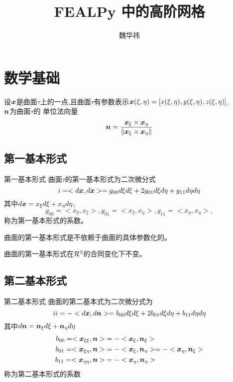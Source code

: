 \documentclass{article}
\begin{document}
\title{FEALPy 中的高阶网格}
\author{魏华祎}
\date{\chntoday}
\maketitle

\section{数学基础}
设${\boldsymbol x}$是曲面$\tau$上的一点,且曲面$\tau$有参数表示${\boldsymbol x}(\xi,\eta) 
= [x(\xi,\eta),y(\xi,\eta),z(\xi,\eta)]$,\\
${\boldsymbol n}$为曲面$\tau$的
单位法向量
$$
{\boldsymbol n} = \frac{{\boldsymbol x}_{\xi} \times {\boldsymbol x}_{\eta}}{\| {\boldsymbol x}_{\xi} \times {\boldsymbol x}_{\eta} \|}
$$
\subsection{第一基本形式}
\begin{definition}{第一基本形式}
	曲面$\tau$的第一基本形式为二次微分式
	$$
	\uppercase\expandafter{\romannumeral1} = 
	<d\bfx,d\bfx> = g_{00}d\xi d\xi + 2g_{01}d\xi d\eta + g_{11}d\eta d\eta 
	$$
	其中$d{\boldsymbol x} = x_{\xi}d\xi+x_{\eta}d\eta$,
	$$
	g_{00} = <x_{\xi},x_{\xi}>,
	g_{01} = <x_{\xi},x_{\eta}>,
	g_{11} = <x_{\eta},x_{\eta}>,
	$$
	称为第一基本形式的系数。
\end{definition}

\begin{property}
曲面的第一基本形式是不依赖于曲面的具体参数化的。
\end{property}

\begin{property}
曲面的第一基本形式在${\mathcal R}^3$的合同变化下不变。
\end{property}

\subsection{第二基本形式}
\begin{definition}{第二基本形式}
曲面的第二基本式为二次微分式为
$$
\uppercase\expandafter{\romannumeral2} = 
-<d\bfx,d\bfn> = b_{00}d\xi d\xi + 2b_{01}d\xi d\eta + b_{11}d\eta d\eta 
$$
其中$d{\boldsymbol n} = {\boldsymbol n}_{\xi} d\xi + {\boldsymbol n}_{\eta}d\eta$
\begin{align*}
b_{00} = <{\boldsymbol x}_{\xi \xi},{\boldsymbol n}> &= -<{\boldsymbol x}_{\xi},{\boldsymbol n}_{\xi}> \\
b_{01} = <{\boldsymbol x}_{\xi \eta},{\boldsymbol n}> &= -<{\boldsymbol x}_{\xi},{\boldsymbol n}_{\eta}> = 
- <{\boldsymbol x}_{\eta},{\boldsymbol n}_{\xi}> \\
b_{11} = <{\boldsymbol x}_{\eta \eta},{\boldsymbol n}> &= -<{\boldsymbol x}_{\eta},{\boldsymbol n}_{\eta}> 
\end{align*}
称为第二基本形式的系数
\end{definition}
\end{document}
